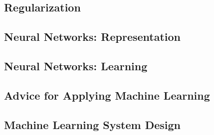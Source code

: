 \documentclass[english, 11pt]{article}
\begin{document}
	\subsection{Regularization}
	

	\subsection{Neural Networks: Representation}
	

	\subsection{Neural Networks: Learning}
	

	\subsection{Advice for Applying Machine Learning}
	

	\subsection{Machine Learning System Design}
	
\end{document}
